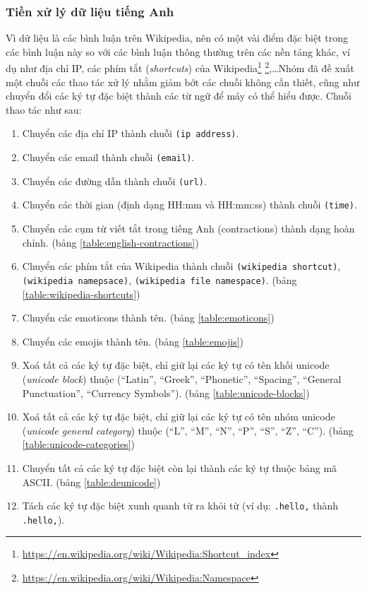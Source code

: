 \subsubsection{Tiền xử lý dữ liệu tiếng Anh}\label{english-preprocess}
Vì dữ liệu là các bình luận trên Wikipedia, nên có một vài điểm đặc biệt trong các bình luận này so với các bình luận thông thường trên các nền tảng khác, ví dụ như địa chỉ IP, các phím tắt (\textit{shortcuts}) của Wikipedia\footnote{\url{https://en.wikipedia.org/wiki/Wikipedia:Shortcut_index}} \footnote{\url{https://en.wikipedia.org/wiki/Wikipedia:Namespace}},\dots Nhóm đã đề xuất một chuỗi các thao tác xử lý nhằm giảm bớt các chuỗi không cần thiết, cũng như chuyển đổi các ký tự đặc biệt thành các từ ngữ để máy có thể hiểu được. Chuỗi thao tác như sau:
\begin{enumerate}
    \item Chuyển các địa chỉ IP thành chuỗi \texttt{(ip address)}.
    \item Chuyển các email thành chuỗi \texttt{(email)}.
    \item Chuyển các đường dẫn thành chuỗi \texttt{(url)}.
    \item Chuyển các thời gian (định dạng HH:mm và HH:mm:ss) thành chuỗi \texttt{(time)}.
    \item Chuyển các cụm từ viết tắt trong tiếng Anh (contractions) thành dạng hoàn chỉnh. (bảng \ref{table:english-contractions})
    \item Chuyển các phím tắt của Wikipedia thành chuỗi \texttt{(wikipedia shortcut)}, \\\texttt{(wikipedia namepsace)}, \texttt{(wikipedia file namespace)}. (bảng \ref{table:wikipedia-shortcuts})
    \item Chuyển các emoticons thành tên. (bảng \ref{table:emoticons})
    \item Chuyển các emojis thành tên. (bảng \ref{table:emojis})
    \item Xoá tất cả các ký tự đặc biệt, chỉ giữ lại các ký tự có tên khối unicode (\textit{unicode block}) thuộc (``Latin'', ``Greek'', ``Phonetic'', ``Spacing'', ``General Punctuation'', ``Currency Symbols''). (bảng \ref{table:unicode-blocks})
    \item Xoá tất cả các ký tự đặc biệt, chỉ giữ lại các ký tự có tên nhóm unicode (\textit{unicode general category}) thuộc (``L'', ``M'', ``N'', ``P'', ``S'', ``Z'', ``C''). (bảng \ref{table:unicode-categories})
    \item Chuyển tất cả các ký tự đặc biệt còn lại thành các ký tự thuộc bảng mã ASCII. (bảng \ref{table:deunicode})
    \item Tách các ký tự đặc biệt xunh quanh từ ra khỏi từ (ví dụ: {\tt .hello,} thành {\tt .\textvisiblespace hello\textvisiblespace,}).
\end{enumerate}

